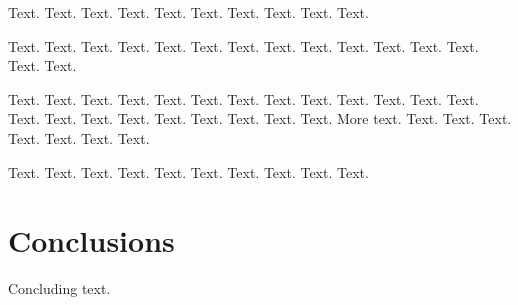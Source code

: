 \documentclass[11pt]{article}
\begin{document}
Text. Text. Text. Text. Text.
Text. Text. Text. Text. Text.

Text. Text. Text. Text. Text.
Text. Text. Text. Text. Text.
Text. Text. Text. Text. Text.

Text. Text. Text. Text. Text.
Text. Text. Text. Text. Text.
Text. Text. Text. Text. Text.
Text. Text. Text. Text. Text.
Text. Text. More text. Text. Text.
Text. Text. Text. Text. Text.

Text. Text. Text. Text. Text.
Text. Text. Text. Text. Text.

\section{Conclusions}

Concluding text.



\end{document}
